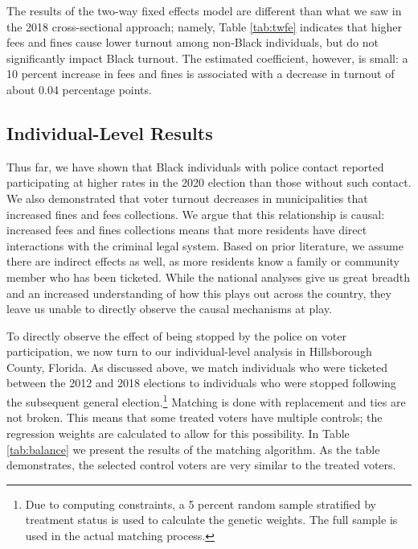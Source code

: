 \documentclass[
  12pt,
]{article}
\begin{document}
\begin{singlespace}

\end{singlespace}

The results of the two-way fixed effects model are different than what we saw in the 2018 cross-sectional approach; namely, Table \ref{tab:twfe} indicates that higher fees and fines cause lower turnout among non-Black individuals, but do not significantly impact Black turnout. The estimated coefficient, however, is small: a 10 percent increase in fees and fines is associated with a decrease in turnout of about 0.04 percentage points.

\hypertarget{individual-level-results}{%
\subsection*{Individual-Level Results}\label{individual-level-results}}

Thus far, we have shown that Black individuals with police contact reported participating at higher rates in the 2020 election than those without such contact. We also demonstrated that voter turnout decreases in municipalities that increased fines and fees collections. We argue that this relationship is causal: increased fees and fines collections means that more residents have direct interactions with the criminal legal system. Based on prior literature, we assume there are indirect effects as well, as more residents know a family or community member who has been ticketed. While the national analyses give us great breadth and an increased understanding of how this plays out across the country, they leave us unable to directly observe the causal mechanisms at play.

To directly observe the effect of being stopped by the police on voter participation, we now turn to our individual-level analysis in Hillsborough County, Florida. As discussed above, we match individuals who were ticketed between the 2012 and 2018 elections to individuals who were stopped following the subsequent general election.\footnote{Due to computing constraints, a 5 percent random sample stratified by treatment status is used to calculate the genetic weights. The full sample is used in the actual matching process.} Matching is done with replacement and ties are not broken. This means that some treated voters have multiple controls; the regression weights are calculated to allow for this possibility. In Table \ref{tab:balance} we present the results of the matching algorithm. As the table demonstrates, the selected control voters are very similar to the treated voters.
\end{document}
